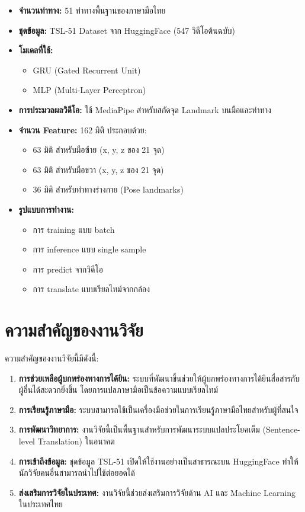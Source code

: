 \documentclass[12pt,a4paper]{report}
\begin{document}
\begin{itemize}
    \item \textbf{จำนวนท่าทาง:} 51 ท่าทางพื้นฐานของภาษามือไทย
    \item \textbf{ชุดข้อมูล:} TSL-51 Dataset จาก HuggingFace (547 วิดีโอต้นฉบับ)
    \item \textbf{โมเดลที่ใช้:} 
    \begin{itemize}
        \item GRU (Gated Recurrent Unit)
        \item MLP (Multi-Layer Perceptron)
    \end{itemize}
    \item \textbf{การประมวลผลวิดีโอ:} ใช้ MediaPipe สำหรับสกัดจุด Landmark บนมือและท่าทาง
    \item \textbf{จำนวน Feature:} 162 มิติ ประกอบด้วย:
    \begin{itemize}
        \item 63 มิติ สำหรับมือซ้าย (x, y, z ของ 21 จุด)
        \item 63 มิติ สำหรับมือขวา (x, y, z ของ 21 จุด)
        \item 36 มิติ สำหรับท่าทางร่างกาย (Pose landmarks)
    \end{itemize}
    \item \textbf{รูปแบบการทำงาน:}
    \begin{itemize}
        \item การ training แบบ batch
        \item การ inference แบบ single sample
        \item การ predict จากวิดีโอ
        \item การ translate แบบเรียลไทม์จากกล้อง
    \end{itemize}
\end{itemize}

\section{ความสำคัญของงานวิจัย}

ความสำคัญของงานวิจัยนี้มีดังนี้:

\begin{enumerate}
    \item \textbf{การช่วยเหลือผู้บกพร่องทางการได้ยิน:} ระบบที่พัฒนาขึ้นช่วยให้ผู้บกพร่องทางการได้ยินสื่อสารกับผู้อื่นได้สะดวกยิ่งขึ้น 
    โดยการแปลภาษามือเป็นข้อความแบบเรียลไทม์
    
    \item \textbf{การเรียนรู้ภาษามือ:} ระบบสามารถใช้เป็นเครื่องมือช่วยในการเรียนรู้ภาษามือไทยสำหรับผู้ที่สนใจ
    
    \item \textbf{การพัฒนาวิทยาการ:} งานวิจัยนี้เป็นพื้นฐานสำหรับการพัฒนาระบบแปลประโยคเต็ม (Sentence-level Translation) ในอนาคต
    
    \item \textbf{การเข้าถึงข้อมูล:} ชุดข้อมูล TSL-51 เปิดให้ใช้งานอย่างเป็นสาธารณะบน HuggingFace ทำให้นักวิจัยคนอื่นสามารถนำไปใช้ต่อยอดได้
    
    \item \textbf{ส่งเสริมการวิจัยในประเทศ:} งานวิจัยนี้ช่วยส่งเสริมการวิจัยด้าน AI และ Machine Learning ในประเทศไทย
\end{enumerate}
\end{document}
